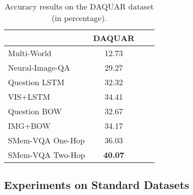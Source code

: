 \begin{table}[!t]
\centering
\caption{Accuracy results on the DAQUAR dataset (in percentage).}
\small
 \begin{tabular}{l || c c c} 
 \hline
 ~ & DAQUAR\\ \hline
 Multi-World~\cite{DBLP:journals/corr/MalinowskiF14} & 12.73 \\ Neural-Image-QA~\cite{malinowski2015ask} & 29.27  \\ Question LSTM~\cite{malinowski2015ask} & 32.32 \\ VIS+LSTM~\cite{DBLP:journals/corr/RenKZ15} & 34.41 \\ Question BOW~\cite{DBLP:journals/corr/RenKZ15} & 32.67 \\ IMG+BOW~\cite{DBLP:journals/corr/RenKZ15} & 34.17 \\ \hline
SMem-VQA One-Hop & 36.03 \\ SMem-VQA Two-Hop & \bf{40.07} \\ \hline 
\end{tabular}
\label{fig:baseline}
\vspace{-0.2in}
\end{table}


\subsection{Experiments on Standard Datasets}\label{sec:expstandard}
